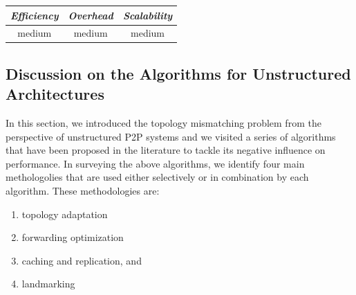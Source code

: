 \begin{center}
\begin{tabular}{ccc}
\emph{Efficiency} & \emph{Overhead} & \emph{Scalability} \\
\hline
medium &
medium &
medium
\end{tabular}
\end{center}

\subsection{Discussion on the Algorithms for Unstructured Architectures}


In this section, we introduced the topology mismatching problem from the
perspective of unstructured P2P systems and we visited a series
of algorithms that have been proposed in the literature to tackle its negative
influence on performance. In surveying the above algorithms, we identify
four main methologolies that are used either selectively or in combination
by each algorithm.  
These methodologies are:
\begin{enumerate}
  \item topology adaptation
  \item forwarding optimization
  \item caching and replication, and
  \item landmarking
\end{enumerate}


